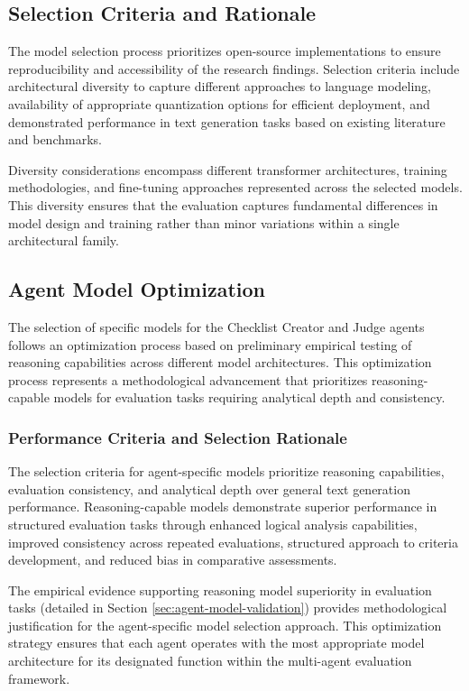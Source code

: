 \subsection{Selection Criteria and Rationale}

The model selection process prioritizes open-source implementations to ensure reproducibility and accessibility of the research findings. Selection criteria include architectural diversity to capture different approaches to language modeling, availability of appropriate quantization options for efficient deployment, and demonstrated performance in text generation tasks based on existing literature and benchmarks.

Diversity considerations encompass different transformer architectures, training methodologies, and fine-tuning approaches represented across the selected models. This diversity ensures that the evaluation captures fundamental differences in model design and training rather than minor variations within a single architectural family.

\subsection{Agent Model Optimization}

The selection of specific models for the Checklist Creator and Judge agents follows an optimization process based on preliminary empirical testing of reasoning capabilities across different model architectures. This optimization process represents a methodological advancement that prioritizes reasoning-capable models for evaluation tasks requiring analytical depth and consistency.

\subsubsection{Performance Criteria and Selection Rationale}

The selection criteria for agent-specific models prioritize reasoning capabilities, evaluation consistency, and analytical depth over general text generation performance. Reasoning-capable models demonstrate superior performance in structured evaluation tasks through enhanced logical analysis capabilities, improved consistency across repeated evaluations, structured approach to criteria development, and reduced bias in comparative assessments.

The empirical evidence supporting reasoning model superiority in evaluation tasks (detailed in Section \ref{sec:agent-model-validation}) provides methodological justification for the agent-specific model selection approach. This optimization strategy ensures that each agent operates with the most appropriate model architecture for its designated function within the multi-agent evaluation framework.

